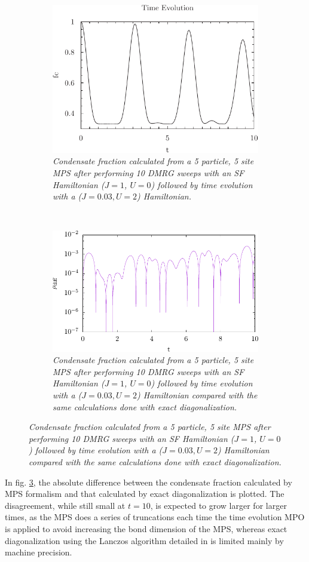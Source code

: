 \begin{figure}[h!]
    \centering
    \begin{subfigure}[t]{0.49\textwidth}
        \includegraphics[width=\textwidth]{Figures/TimeEvo5_U2_J0_03.pdf}
        \caption{\textit{Condensate fraction calculated from a 5 particle, 5 site MPS after performing 10 DMRG sweeps with an SF Hamiltonian ($J=1$, $U=0$) followed by time evolution with a ($J=0.03, U=2$) Hamiltonian.}}
        \label{fig:TimeEvo5_U2_J0_03}
    \end{subfigure}
    ~
    \begin{subfigure}[t]{0.49\textwidth}
        \includegraphics[width=\textwidth]{Figures/TimeEvo5_U2_J0_03_VS_ExactDiag.pdf}
        \caption{\textit{Condensate fraction calculated from a 5 particle, 5 site MPS after performing 10 DMRG sweeps with an SF Hamiltonian ($J=1$, $U=0$) followed by time evolution with a ($J=0.03, U=2$) Hamiltonian compared with the same calculations done with exact diagonalization.}}
        \label{fig:ExDiagComp_U2_J0_03}
    \end{subfigure}
\end{figure}

In fig. \ref{fig:ExDiagComp_U2_J0_03}, the absolute difference between the condensate fraction calculated by MPS formalism and that calculated by exact diagonalization is plotted. The disagreement, while still small at $t=10$, is expected to grow larger for larger times, as the MPS does a series of truncations each time the time evolution MPO is applied to avoid increasing the bond dimension of the MPS, whereas exact diagonalization using the Lanczos algorithm detailed in \cite{Lanczos} is limited mainly by machine precision.